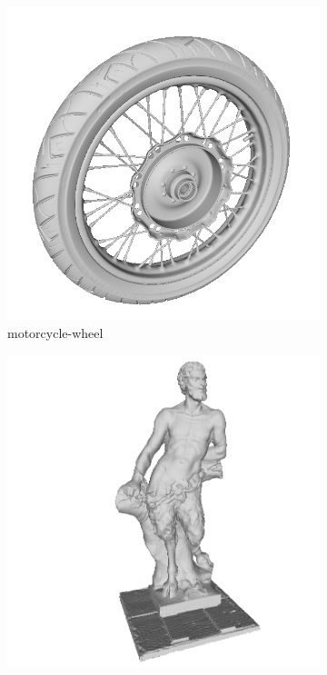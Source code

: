 \begin{figure}
	
	\begin{subfigure}[b]{0.23\linewidth}
		\includegraphics[width=\linewidth]{./Figures/train-dataset/32.motorcycle-wheel.png}
		\caption{motorcycle-wheel}
	\end{subfigure}
	\begin{subfigure}[b]{0.23\linewidth}
		\includegraphics[width=\linewidth]{./Figures/train-dataset/33.pan.png}

\end{subfigure}
\end{figure}
